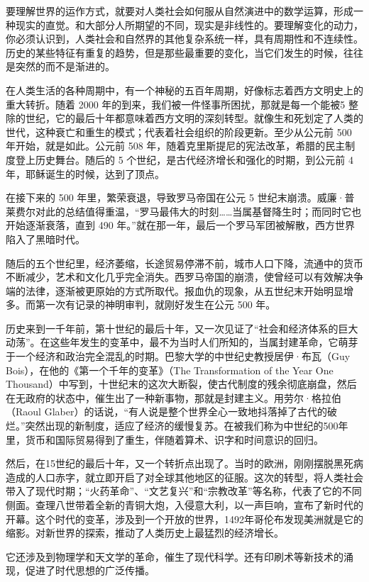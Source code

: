 要理解世界的运作方式，就要对人类社会如何服从自然演进中的数学运算，形成一种现实的直觉。和大部分人所期望的不同，现实是非线性的。要理解变化的动力，你必须认识到，人类社会和自然界的其他复杂系统一样，具有周期性和不连续性。历史的某些特征有重复的趋势，但是那些最重要的变化，当它们发生的时候，往往是突然的而不是渐进的。


在人类生活的各种周期中，有一个神秘的五百年周期，好像标志着西方文明史上的重大转折。随着 2000 年的到来，我们被一件怪事所困扰，那就是每一个能被5 整除的世纪，它的最后十年都意味着西方文明的深刻转型。就像生和死划定了人类的世代，这种衰亡和重生的模式；代表着社会组织的阶段更新。至少从公元前 500 年开始，就是如此。公元前 508 年，随着克里斯提尼的宪法改革，希腊的民主制度登上历史舞台。随后的 5 个世纪，是古代经济增长和强化的时期，到公元前 4 年，耶稣诞生的时候，达到了顶点。


在接下来的 500 年里，繁荣衰退，导致罗马帝国在公元 5 世纪末崩溃。威廉·普莱费尔对此的总结值得重温，“罗马最伟大的时刻……当属基督降生时；而同时它也开始逐渐衰落，直到 490 年。”就在那一年，最后一个罗马军团被解散，西方世界陷入了黑暗时代。


随后的五个世纪里，经济萎缩，长途贸易停滞不前，城市人口下降，流通中的货币不断减少，艺术和文化几乎完全消失。西罗马帝国的崩溃，使曾经可以有效解决争端的法律，逐渐被更原始的方式所取代。报血仇的现象，从五世纪末开始明显增多。而第一次有记录的神明审判，就刚好发生在公元 500 年。


历史来到一千年前，第十世纪的最后十年，又一次见证了“社会和经济体系的巨大动荡”。在这些年发生的变革中，最不为当时人们所知的，当属封建革命，它萌芽于一个经济和政治完全混乱的时期。巴黎大学的中世纪史教授居伊·布瓦（Guy Bois），在他的《第一个千年的变革》（The Transformation of the Year One Thousand）中写到，十世纪末的这次大断裂，使古代制度的残余彻底崩盘，然后在无政府的状态中，催生出了一种新事物，那就是封建主义。用劳尔·格拉伯（Raoul Glaber）的话说，“有人说是整个世界全心一致地抖落掉了古代的破烂。”突然出现的新制度，适应了经济的缓慢复苏。在被我们称为中世纪的500年里，货币和国际贸易得到了重生，伴随着算术、识字和时间意识的回归。


然后，在15世纪的最后十年，又一个转折点出现了。当时的欧洲，刚刚摆脱黑死病造成的人口赤字，就立即开启了对全球其他地区的征服。这次的转型，将人类社会带入了现代时期；“火药革命”、“文艺复兴”和“宗教改革”等名称，代表了它的不同侧面。查理八世带着全新的青铜大炮，入侵意大利，以一声巨响，宣布了新时代的开幕。这个时代的变革，涉及到一个开放的世界，1492年哥伦布发现美洲就是它的缩影。对新世界的探索，推动了人类历史上最猛烈的经济增长。


它还涉及到物理学和天文学的革命，催生了现代科学。还有印刷术等新技术的涌现，促进了时代思想的广泛传播。



